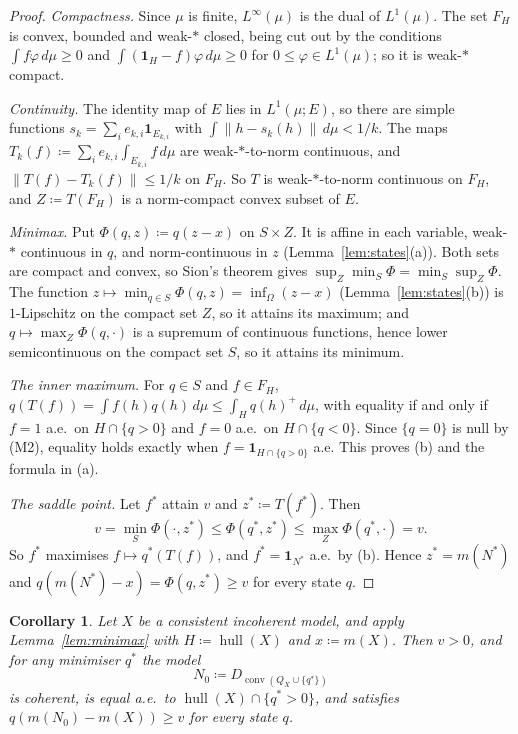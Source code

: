 \documentclass[11pt]{article}
\newcommand{\one}{\mathbf{1}}
\newcommand{\hull}{\operatorname{hull}}
\DeclareMathOperator{\conv}{conv}
\theoremstyle{plain}
\newtheorem{corollary}[theorem]{Corollary}
\theoremstyle{definition}
\begin{document}
\begin{proof}
\emph{Compactness.} Since $\mu$ is finite, $L^\infty(\mu)$ is the dual of $L^1(\mu)$. The set
$F_H$ is convex, bounded and weak-$\ast$ closed, being cut out by the conditions $\int f\varphi
\,d\mu\ge0$ and $\int(\one_H-f)\varphi\,d\mu\ge0$ for $0\le\varphi\in L^1(\mu)$; so it is
weak-$\ast$ compact.

\emph{Continuity.} The identity map of $E$ lies in $L^1(\mu;E)$, so there are simple functions
$s_k=\sum_ie_{k,i}\one_{E_{k,i}}$ with $\int\|h-s_k(h)\|\,d\mu<1/k$. The maps $T_k(f)\coloneqq
\sum_ie_{k,i}\int_{E_{k,i}}f\,d\mu$ are weak-$\ast$-to-norm continuous, and $\|T(f)-T_k(f)\|
\le1/k$ on $F_H$. So $T$ is weak-$\ast$-to-norm continuous on $F_H$, and $Z\coloneqq T(F_H)$ is
a norm-compact convex subset of $E$.

\emph{Minimax.} Put $\Phi(q,z)\coloneqq q(z-x)$ on $S\times Z$. It is affine in each variable,
weak-$\ast$ continuous in $q$, and norm-continuous in $z$ (Lemma~\ref{lem:states}(a)). Both sets
are compact and convex, so Sion's theorem \cite{Sion} gives $\sup_Z\min_S\Phi=\min_S\sup_Z
\Phi$. The function $z\mapsto\min_{q\in S}\Phi(q,z)=\inf_\Omega(z-x)$ (Lemma~\ref{lem:states}(b))
is $1$-Lipschitz on the compact set $Z$, so it attains its maximum; and $q\mapsto\max_Z\Phi(q,
\cdot)$ is a supremum of continuous functions, hence lower semicontinuous on the compact set
$S$, so it attains its minimum.

\emph{The inner maximum.} For $q\in S$ and $f\in F_H$, $q(T(f))=\int f(h)q(h)\,d\mu\le\int_H
q(h)^+\,d\mu$, with equality if and only if $f=1$ a.e.\ on $H\cap\{q>0\}$ and $f=0$ a.e.\ on
$H\cap\{q<0\}$. Since $\{q=0\}$ is null by (M2), equality holds exactly when $f=\one_{H\cap
\{q>0\}}$ a.e. This proves (b) and the formula in (a).

\emph{The saddle point.} Let $f^\ast$ attain $v$ and $z^\ast\coloneqq T(f^\ast)$. Then
\[
  v=\min_S\Phi(\cdot,z^\ast)\le\Phi(q^\ast,z^\ast)\le\max_Z\Phi(q^\ast,\cdot)=v .
\]
So $f^\ast$ maximises $f\mapsto q^\ast(T(f))$, and $f^\ast=\one_{N^\ast}$ a.e.\ by (b). Hence
$z^\ast=m(N^\ast)$ and $q(m(N^\ast)-x)=\Phi(q,z^\ast)\ge v$ for every state $q$.
\end{proof}

\begin{corollary}\label{cor:consistent}
Let $X$ be a consistent incoherent model, and apply Lemma~\ref{lem:minimax} with $H\coloneqq
\hull(X)$ and $x\coloneqq m(X)$. Then $v>0$, and for any minimiser $q^\ast$ the model
\[
  N_0\coloneqq D_{\conv(Q_X\cup\{q^\ast\})}
\]
is coherent, is equal a.e.\ to $\hull(X)\cap\{q^\ast>0\}$, and satisfies $q(m(N_0)-m(X))\ge v$
for every state $q$.
\end{corollary}
\end{document}
